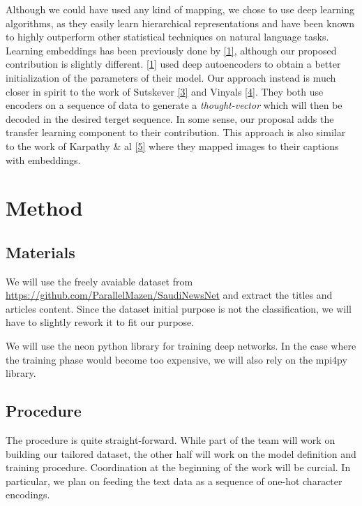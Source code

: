 \documentclass[12pt]{article}
\begin{document}
Although we could have used any kind of mapping, we chose to use deep
learning algorithms, as they easily learn hierarchical representations
and have been known to highly outperform other statistical techniques on
natural language tasks. Learning embeddings has been previously done by
\href{References}{{[}1{]}}, although our proposed contribution is
slightly different. \href{References}{{[}1{]}} used deep autoencoders to
obtain a better initialization of the parameters of their model. Our
approach instead is much closer in spirit to the work of Sutskever
\href{References}{{[}3{]}} and Vinyals \href{References}{{[}4{]}}. They
both use encoders on a sequence of data to generate a
\emph{thought-vector} which will then be decoded in the desired terget
sequence. In some sense, our proposal adds the transfer learning
component to their contribution. This approach is also similar to the
work of Karpathy \& al \href{References}{{[}5{]}} where they mapped
images to their captions with embeddings.

\section{Method}\label{method}

\subsection{Materials}\label{materials}

We will use the freely avaiable dataset from
\url{https://github.com/ParallelMazen/SaudiNewsNet} and extract the
titles and articles content. Since the dataset initial purpose is not
the classification, we will have to slightly rework it to fit our
purpose.

We will use the neon python library for training deep networks. In the
case where the training phase would become too expensive, we will also
rely on the mpi4py library.

\subsection{Procedure}\label{procedure}

The procedure is quite straight-forward. While part of the team will
work on building our tailored dataset, the other half will work on the
model definition and training procedure. Coordination at the beginning
of the work will be curcial. In particular, we plan on feeding the text
data as a sequence of one-hot character encodings.
\end{document}
